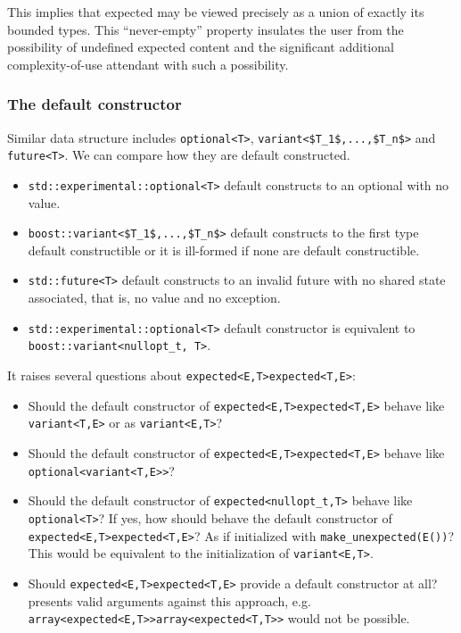\documentclass[a4paper,10pt]{article}
\newcommand{\cpp}[1]{\lstinline{#1}}
\newcommand{\suppress}[1]{\colorbox{suppress_color}{#1}}
\newcommand{\update}[1]{\colorbox{update_color}{#1}}
\begin{document}
This implies that expected may be viewed precisely as a union of exactly its bounded types. This ``never-empty'' property insulates the user from the possibility of undefined expected content and the significant additional complexity-of-use attendant with such a possibility.

\subsubsection{The default constructor}

Similar data structure includes \cpp{optional<T>}, \lstinline[mathescape]{variant<$T_1$,...,$T_n$>} and \cpp{future<T>}. We can compare how they are default constructed.
\begin{itemize}
\item \cpp{std::experimental::optional<T>} default constructs to an optional with no value. 
\item \lstinline[mathescape]{boost::variant<$T_1$,...,$T_n$>} default constructs to the first type default constructible or it is ill-formed if none are default constructible.
\item \cpp{std::future<T>} default constructs to an invalid future with no shared state associated, that is, no value and no exception.
\item \cpp{std::experimental::optional<T>} default constructor is equivalent to \cpp{boost::variant<nullopt_t, T>}.
\end{itemize}

\noindent
It raises several questions about \suppress{\cpp{expected<E,T>}}\update{\cpp{expected<T,E>}}:

\begin{itemize}
\item Should the default constructor of \suppress{\cpp{expected<E,T>}}\update{\cpp{expected<T,E>}} behave like \cpp{variant<T,E>} or as \cpp{variant<E,T>}?
\item Should the default constructor of \suppress{\cpp{expected<E,T>}}\update{\cpp{expected<T,E>}} behave like \cpp{optional<variant<T,E>>}?
\item Should the default constructor of \cpp{expected<nullopt_t,T>} behave like \cpp{optional<T>}? If yes, how should behave the default constructor of \suppress{\cpp{expected<E,T>}}\update{\cpp{expected<T,E>}}? As if initialized with \cpp{make_unexpected(E())}? This would be equivalent to the initialization of \cpp{variant<E,T>}.
\item Should \suppress{\cpp{expected<E,T>}}\update{\cpp{expected<T,E>}} provide a default constructor at all? \cite{OptionalRev3} presents valid arguments against this approach, e.g. \suppress{\cpp{array<expected<E,T>>}}\update{\cpp{array<expected<T,T>>}} would not be possible. 
\end{itemize}
\end{document}
